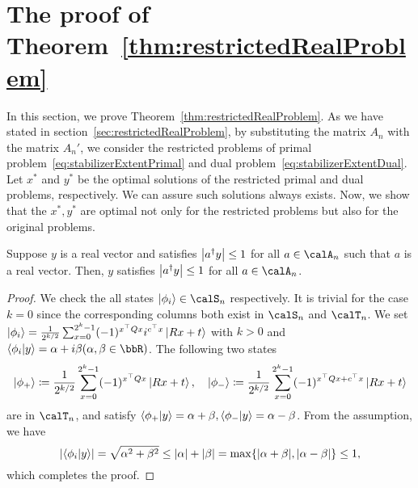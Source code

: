 \documentclass[\main/main]{subfiles}
\begin{document}

\section{The proof of Theorem~\ref{thm:restrictedRealProblem}}

In this section, we prove Theorem~\ref{thm:restrictedRealProblem}.
As we have stated in section~\ref{sec:restrictedRealProblem},
by substituting the matrix $A_n$ with the matrix $A_n'$,
we consider the restricted problems of
primal problem~\eqref{eq:stabilizerExtentPrimal}
and dual problem~\eqref{eq:stabilizerExtentDual}.
Let $x^*$ and $y^*$ be the optimal solutions of the restricted
primal and dual problems, respectively.
We can assure such solutions always exists.
Now, we show that the $x^*, y^*$ are
optimal not only for the restricted problems
but also for the original problems.

\begin{lemma}{\label{lem:absRealForTIsAbsRealForS}}
    Suppose $y$ is a real vector and satisfies
    $\abs{a^\dagger y} \leq 1$ for all $a \in \calA_n$
    such that $a$ is a real vector.
    Then, $y$ satisfies
    $\abs{a^\dagger y} \leq 1$ for all $a \in \calA_n$.
\end{lemma}
\begin{proof}
    We check the all states $\ket{\phi_i} \in \calS_n$ respectively.
    It is trivial for the case $k=0$ since the corresponding columns both exist in $\calS_n$ and $\calT_n$.
    We set $\ket{\phi_i} = \frac{1}{2^{k/2}}\sum_{x=0}^{2^k-1} (-1)^{x^\top Q x} i^{c^\top x} \ket{Rx+t}$ with $k>0$
    and $\braket{\phi_i}{y} = \alpha + i\beta (\alpha, \beta \in \bbR)$.
    The following two states
    \begin{equation*}
        \ket{\phi_+} \coloneqq \frac{1}{2^{k/2}}\sum_{x=0}^{2^k-1} (-1)^{x^\top Q x} \ket{Rx+t}, \quad
        \ket{\phi_-} \coloneqq \frac{1}{2^{k/2}}\sum_{x=0}^{2^k-1} (-1)^{x^\top Q x + c^\top x} \ket{Rx+t}
    \end{equation*}
    are in $\calT_n$, and satisfy $\braket{\phi_+}{y} = \alpha+\beta, \braket{\phi_-}{y} = \alpha-\beta$.
    From the assumption, we have
    \begin{equation*}
        \abs{\braket{\phi_i}{y}}
        =\sqrt{\alpha^2 + \beta^2}
        \leq \abs{\alpha}+\abs{\beta}
        = \max\{\abs{\alpha+\beta}, \abs{\alpha-\beta}\}
        \leq 1,
    \end{equation*}
    which completes the proof.
\end{proof}
\end{document}

